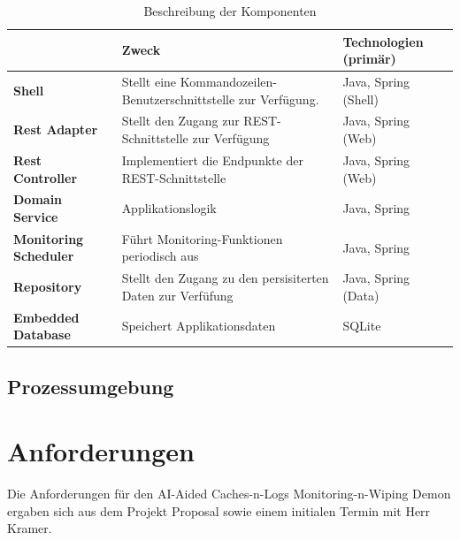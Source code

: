 \documentclass[a4paper,12pt]{report}
\begin{document}
    \begin{table}[h!]
        \centering
        \setlength{\leftmargini}{0.4cm}
        \begin{tabular}{|p{2.5cm}|p{5.5cm}|p{3cm}|}
            \hline
            \textbf                       & \textbf{Zweck}                                                    & \textbf{Technologien (primär)} \\
            \hline
            \textbf{Shell}                & {Stellt eine Kommandozeilen-Benutzerschnittstelle zur Verfügung.} & Java, Spring (Shell)           \\
            \hline
            \textbf{Rest Adapter}         & {Stellt den Zugang zur REST-Schnittstelle zur Verfügung}          & Java, Spring (Web)             \\
            \hline
            \textbf{Rest Controller}      & Implementiert die Endpunkte der REST-Schnittstelle                & Java, Spring (Web)             \\
            \hline
            \textbf{Domain Service}       & Applikationslogik                                                 & Java, Spring                   \\
            \hline
            \textbf{Monitoring Scheduler} & Führt Monitoring-Funktionen periodisch aus                        & Java, Spring                   \\
            \hline
            \textbf{Repository}           & Stellt den Zugang zu den persisiterten Daten zur Verfüfung        & Java, Spring (Data)            \\
            \hline
            \textbf{Embedded Database}    & Speichert Applikationsdaten                                       & SQLite                         \\
            \hline
        \end{tabular}
        \caption{Beschreibung der Komponenten}\label{tab:table3}
    \end{table}

    \newpage

    \subsection{Prozessumgebung}

    \newpage


    \section{Anforderungen}
    Die Anforderungen für den AI-Aided Caches-n-Logs Monitoring-n-Wiping Demon ergaben sich aus dem Projekt Proposal sowie einem initialen Termin mit Herr Kramer.
\end{document}

